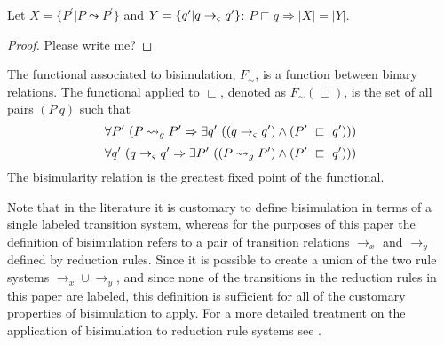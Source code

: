 \begin{lemma}
\label{lem:succCount}
Let $X = \{P^\prime | P \leadsto P^\prime\}$ and $Y = \{q^\prime | q
\rightarrow_{\varsigma} q^\prime\}$: $P \sqsubset q \Rightarrow |X| = |Y|$.
\end{lemma}
\begin{proof}
Please write me?
\end{proof}

\begin{definition}
\label{bisimulation}
The functional associated to bisimulation,  $F_\sim$, is a function between binary relations. The functional applied to $\sqsubset$, denoted as $F_\sim(\sqsubset)$, is the set of all pairs
$(P\ q)$ such that
\begin{equation}
\label{eqn:BisimulationForwards}
\forall P^\prime\ ( P \leadsto_{g} P^\prime \Rightarrow \exists q^\prime\ ( (q \rightarrow_{\varsigma} q^\prime )\wedge (P^\prime\ \sqsubset\ q^\prime )))
\end{equation}
\begin{equation}
\label{eqn:BisimulationBackwards}
\forall q^\prime\ ( q \rightarrow_{\varsigma} q^\prime\Rightarrow \exists P^\prime\ ( (P \leadsto_{g} P^\prime )\wedge (P^\prime\ \sqsubset\ q^\prime )))
\end{equation}
The bisimularity relation is the greatest fixed point of the functional.
\end{definition}

Note that in the literature it is customary to define bisimulation in
terms of a single labeled transition system, whereas for the purposes
of this paper the definition of bisimulation refers to a pair of
transition relations $\rightarrow_x$ and $\rightarrow_y$ defined by
reduction rules. Since it is possible to create a union of the two
rule systems $\rightarrow_x \cup \rightarrow_y$, and since none of the
transitions in the reduction rules in this paper are labeled, this
definition is sufficient for all of the customary properties of
bisimulation to apply. For a more detailed treatment on the
application of bisimulation to reduction rule systems see
\cite{GSE:barbedbisimulation}.

